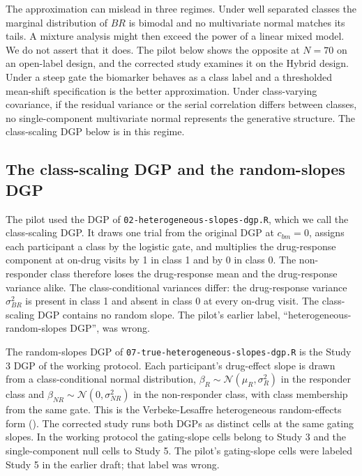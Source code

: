 \documentclass[
  11pt,
]{article}
\begin{document}
The approximation can mislead in three regimes. Under well separated
classes the marginal distribution of \(BR\) is bimodal and no
multivariate normal matches its tails. A mixture analysis might then
exceed the power of a linear mixed model. We do not assert that it
does. The pilot below shows the opposite at \(N = 70\) on an open-label
design, and the corrected study examines it on the Hybrid design.
Under a steep gate the biomarker behaves as a class label and a
thresholded mean-shift specification is the better approximation.
Under class-varying covariance, if the residual variance or the
serial correlation differs between classes, no single-component
multivariate normal represents the generative structure. The
class-scaling DGP below is in this regime.

\subsection{The class-scaling DGP and the random-slopes DGP}\label{the-class-scaling-dgp-and-the-random-slopes-dgp}

The pilot used the DGP of
\texttt{02-heterogeneous-slopes-dgp.R}, which we call the class-scaling
DGP. It draws one trial from the original DGP at \(c_{bm} = 0\),
assigns each participant a class by the logistic gate, and
multiplies the drug-response component at on-drug visits by 1 in
class 1 and by 0 in class 0. The non-responder class therefore loses
the drug-response mean and the drug-response variance alike. The
class-conditional variances differ: the drug-response variance
\(\sigma_{BR}^2\) is present in class 1 and absent in class 0 at every
on-drug visit. The class-scaling DGP contains no random slope. The
pilot's earlier label, ``heterogeneous-random-slopes DGP'', was wrong.

The random-slopes DGP of \texttt{07-true-heterogeneous-slopes-dgp.R} is the
Study 3 DGP of the working protocol. Each participant's drug-effect
slope is drawn from a class-conditional normal distribution,
\(\beta_R \sim \mathcal N(\mu_R, \sigma_R^2)\) in the responder class
and \(\beta_{NR} \sim \mathcal N(0, \sigma_{NR}^2)\) in the
non-responder class, with class membership from the same gate. This
is the Verbeke-Lesaffre heterogeneous random-effects form
(). The corrected study runs both DGPs as
distinct cells at the same gating slopes. In the working protocol the
gating-slope cells belong to Study 3 and the single-component null
cells to Study 5. The pilot's gating-slope cells were labeled Study 5
in the earlier draft; that label was wrong.
\end{document}

